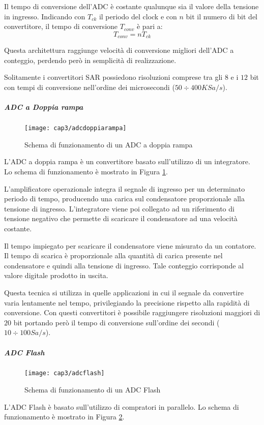 Il tempo di conversione dell'ADC è costante qualunque sia il valore della tensione in ingresso. Indicando con $T_{ck}$ il periodo del clock e con $n$ bit il numero di bit del convertitore, il tempo di conversione $T_{conv}$ è pari a:
\begin{equation}
	T_{conv}=nT_{ck}
\end{equation}

Questa architettura raggiunge velocità di conversione migliori dell'ADC a conteggio, perdendo però in semplicità di realizzazione.

Solitamente i convertitori SAR possiedono risoluzioni comprese tra gli $8$ e i $12$ bit con tempi di conversione nell'ordine dei microsecondi ($50 \div 400 KSa/s$).

\subparagraph{\textbf{ADC a Doppia rampa}}
\begin{figure}  
  \begin{center}
    \texttt{[image: cap3/adcdoppiarampa]}
    \caption{Schema di funzionamento di un ADC a doppia rampa}
    \label{adcdoppiarampa}
  \end{center}
\end{figure}
L'ADC a doppia rampa è un convertitore basato sull'utilizzo di un integratore. Lo schema di funzionamento è mostrato in Figura \ref{adcdoppiarampa}.

L'amplificatore operazionale integra il segnale di ingresso per un determinato periodo di tempo, producendo una carica sul condensatore proporzionale alla tensione di ingresso. L'integratore viene poi collegato ad un riferimento di tensione negativo che permette di scaricare il condensatore ad una velocità costante.

Il tempo impiegato per scaricare il condensatore viene misurato da un contatore. Il tempo di scarica è proporzionale alla quantità di carica presente nel condensatore e quindi alla tensione di ingresso. Tale conteggio corrisponde al valore digitale prodotto in uscita.

Questa tecnica si utilizza in quelle applicazioni in cui il segnale da convertire varia lentamente nel tempo, privilegiando la precisione rispetto alla rapidità di conversione. Con questi convertitori è possibile raggiungere risoluzioni maggiori di $20$ bit portando però il tempo di conversione sull'ordine dei secondi ($10 \div 100 Sa/s$).

\subparagraph{\textbf{ADC Flash}}
\begin{figure}  
  \begin{center}
    \texttt{[image: cap3/adcflash]}
    \caption{Schema di funzionamento di un ADC Flash}
    \label{adcflash}
  \end{center}
\end{figure}
L'ADC Flash è basato sull'utilizzo di compratori in parallelo. Lo schema di funzionamento è mostrato in Figura \ref{adcflash}.

